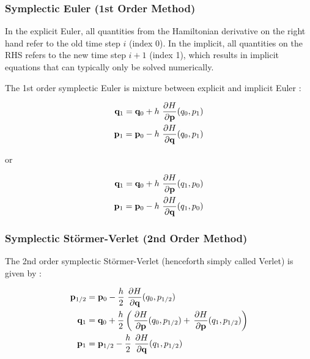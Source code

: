 \subsubsection{Symplectic Euler (1st Order Method)}
In the explicit Euler, all quantities from the Hamiltonian derivative on the right hand refer to the old time step $i$ (index 0). In the implicit, all quantities on the RHS refers to the new time step $i+1$ (index 1), which results in implicit equations that can typically only be solved numerically.

The 1st order symplectic Euler is mixture between explicit and implicit Euler \cite{Hairer}:

\begin{equation}
    \begin{split} \label{eq:symplectic-euler1}
        \mathbf{q}_1 = \mathbf{q}_0 + h \operatorname{}\frac{\partial H}{\partial \mathbf{p}}(q_0, p_1) \\
        \mathbf{p}_1 = \mathbf{p}_0 - h \operatorname{}\frac{\partial H}{\partial \mathbf{q}}(q_0, p_1)
    \end{split}
\end{equation}

or

\begin{equation}
    \begin{split} \label{eq:symplectic-euler2}
        \mathbf{q}_1 = \mathbf{q}_0 + h \operatorname{}\frac{\partial H}{\partial \mathbf{p}}(q_1, p_0) \\
        \mathbf{p}_1 = \mathbf{p}_0 - h \operatorname{}\frac{\partial H}{\partial \mathbf{q}}(q_1, p_0)
    \end{split}
\end{equation}

\subsubsection{Symplectic Störmer-Verlet (2nd Order Method)}

The 2nd order symplectic Störmer-Verlet (henceforth simply called Verlet) is given by \cite{Hairer}:

\begin{equation}
    \begin{split} \label{eq:symplectic-verlet1}
        \mathbf{p}_{1/2} &= \mathbf{p}_0 - \frac{h}{2} \operatorname{}\frac{\partial H}{\partial \mathbf{q}}(q_0, p_{1/2}) \\
        \mathbf{q}_1 &= \mathbf{q}_0 + \frac{h}{2} \left( \operatorname{}\frac{\partial H}{\partial \mathbf{p}}(q_0, p_{1/2}) + \operatorname{}\frac{\partial H}{\partial \mathbf{p}}(q_1, p_{1/2}) \right) \\
        \mathbf{p}_{1} &= \mathbf{p}_{1/2} - \frac{h}{2} \operatorname{}\frac{\partial H}{\partial \mathbf{q}}(q_1, p_{1/2}) \\
    \end{split}
\end{equation}

